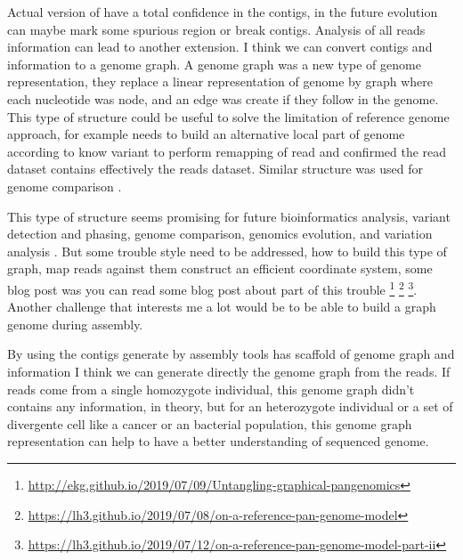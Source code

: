 \documentclass[main.tex]{subfiles}
\begin{document}
Actual version of \knot have a total confidence in the contigs, in the future evolution can maybe mark some spurious region or break contigs. Analysis of all reads information can lead to another extension. I think we can convert contigs and \knot \OLC information to a genome graph. A genome graph was a new type of genome representation, they replace a linear representation of genome by graph where each nucleotide was node, and an edge was create if they follow in the genome. This type of structure could be useful to solve the limitation of reference genome approach, for example  \cite{whatshap} needs to build an alternative local part of genome according to know variant to perform remapping of read and confirmed the read dataset contains effectively the reads dataset. Similar structure was used for genome comparison  \cite{cactus_graph}.

This type of structure seems promising for future bioinformatics analysis, variant detection and phasing, genome comparison,  genomics evolution, and variation analysis \cite{goodbye_ref_hello_graphs}. But some trouble style need to be addressed, how to build this type of graph, map reads against them construct an efficient coordinate system, some blog post was you can read some blog post about part of this trouble \footnote{\url{http://ekg.github.io/2019/07/09/Untangling-graphical-pangenomics}} \footnote{\url{https://lh3.github.io/2019/07/08/on-a-reference-pan-genome-model}} \footnote{\url{https://lh3.github.io/2019/07/12/on-a-reference-pan-genome-model-part-ii}}. Another challenge that interests me a lot would be to be able to build a graph genome during assembly.

By using the contigs generate by assembly tools has scaffold of genome graph and \knot \OLC information I think we can generate directly the genome graph from the reads. If reads come from a single homozygote individual, this genome graph didn't contains any information, in theory, but for an heterozygote individual or a set of divergente cell like a cancer or an bacterial population, this genome graph representation can help to have a better understanding of sequenced genome.

\end{document}
